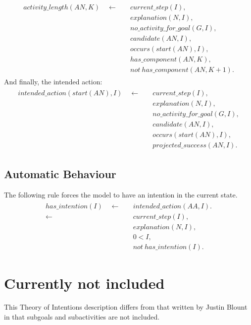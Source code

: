\documentclass[11pt, oneside]{article}
\begin{document}
\begin{align}\begin{split}
activity\_length(AN,K) \quad \leftarrow \quad &current\_step(I),\\
&explanation(N,I),\\
&no\_activity\_for\_goal(G,I),\\
&candidate(AN,I),\\
&occurs(start(AN),I),\\
&has\_component(AN,K),\\
&not\ has\_component(AN,K+1).
\end{split}\end{align}
And finally, the intended action:
\begin{align}\begin{split}
intended\_action(start(AN),I)\quad \leftarrow \quad &current\_step(I),\\
&explanation(N,I),\\
&no\_activity\_for\_goal(G,I),\\
&candidate(AN,I),\\
&occurs(start(AN),I),\\
&projected\_success(AN,I).
\end{split}\end{align}

\subsection{Automatic Behaviour}
The following rule  forces the model to have an intention in the current state.
\begin{align}\begin{split}
has\_intention(I)\quad \leftarrow \quad &intended\_action(AA,I).\\
\leftarrow \quad &current\_step(I),\\ &explanation(N,I),\\&0<I,\\ &not\ has\_intention(I).
\end{split}\end{align}


\section{Currently not included}
This Theory of Intentions description differs from that written by Justin Blount in that subgoals and subactivities are not included.
 
 

%
%
 
 
 
\end{document}
